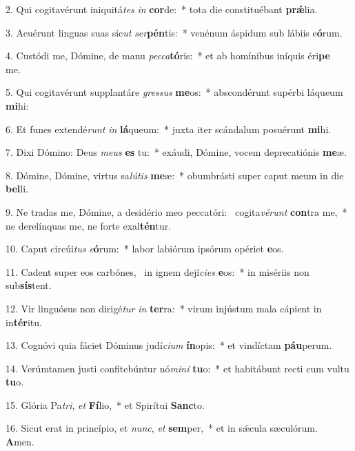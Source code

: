 2. Qui cogitavérunt iniquitá\textit{tes} \textit{in} \textbf{cor}de:~*  tota die constituébant \textbf{prǽ}lia.\

3. Acuérunt linguas suas sic\textit{ut} \textit{ser}\textbf{pén}tis:~*  venénum áspidum sub lábiis e\textbf{ó}rum.\

4. Custódi me, Dómine, de manu \textit{pec}\textit{ca}\textbf{tó}ris:~*  et ab homínibus iníquis éri\textbf{pe} me.\

5. Qui cogitavérunt supplantáre \textit{gres}\textit{sus} \textbf{me}os:~*  abscondérunt supérbi láqueum \textbf{mi}hi:\

6. Et funes extendé\textit{runt} \textit{in} \textbf{lá}queum:~*  juxta iter scándalum posuérunt \textbf{mi}hi.\

7. Dixi Dómino: Deus \textit{me}\textit{us} \textbf{es} tu:~*  exáudi, Dómine, vocem deprecatiónis \textbf{me}æ.\

8. Dómine, Dómine, virtus sa\textit{lú}\textit{tis} \textbf{me}æ:~*  obumbrásti super caput meum in die \textbf{bel}li.\

9. Ne tradas me, Dómine, a desidério meo peccatóri: \dag\  cogita\textit{vé}\textit{runt} \textbf{con}tra me,~*  ne derelínquas me, ne forte exal\textbf{tén}tur.\

10. Caput circúi\textit{tus} \textit{e}\textbf{ó}rum:~*  labor labiórum ipsórum opériet \textbf{e}os.\

11. Cadent super eos carbónes, \dag\  in ignem dejí\textit{ci}\textit{es} \textbf{e}os:~*  in misériis non sub\textbf{sís}tent.\

12. Vir linguósus non dirigé\textit{tur} \textit{in} \textbf{ter}ra:~*  virum injústum mala cápient in in\textbf{tér}itu.\

13. Cognóvi quia fáciet Dóminus judí\textit{ci}\textit{um} \textbf{ín}opis:~*  et vindíctam \textbf{páu}perum.\

14. Verúmtamen justi confitebúntur nó\textit{mi}\textit{ni} \textbf{tu}o:~*  et habitábunt recti cum vultu \textbf{tu}o.\

15. Glória Pa\textit{tri}, \textit{et} \textbf{Fí}lio,~*  et Spirítui \textbf{Sanc}to.\

16. Sicut erat in princípio, et \textit{nunc}, \textit{et} \textbf{sem}per,~*  et in sǽcula sæculórum. \textbf{A}men.\

